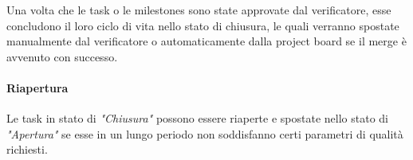 	Una volta che le task o le milestones sono state approvate dal verificatore, esse concludono il loro ciclo di vita nello stato di chiusura, le quali verranno spostate manualmente dal 
	verificatore o automaticamente dalla project board se il merge è avvenuto con successo. 
	
	\paragraph{Riapertura}
	Le task in stato di \textit{"Chiusura"} possono essere riaperte e spostate nello stato di \textit{"Apertura"} se esse in un lungo periodo non soddisfanno certi parametri di qualità
	richiesti. 
	










